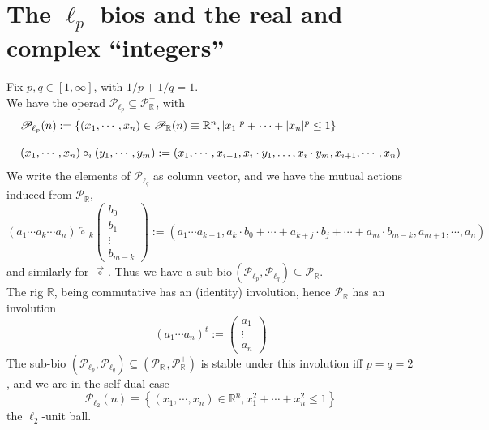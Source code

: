 \documentclass[leqno]{article}
\newcommand{\R}{\mathbb{R}}
\newcommand{\biop}{\mathscr{P}}
\newcommand{\circleftarrow}{\,\overleftarrow{\circ}\,}
\newcommand{\circrightarrow}{\,\overrightarrow{\circ}\,}
\numberwithin{equation}{section}
\begin{document}
\section{The $\ell_{p}$ bios and the real and complex ``integers''} \label{sec:3}
Fix $p,q\in [1,\infty]$, with $1/p + 1/q =1$. \\ 
We have the operad
$\biop_{\ell_p}\subseteq \biop_{\R}^{-}$, with 
\begin{equation}
        \begin{array}[H]{l}
		\biop_{\ell_p}(n):= \left\{ (x_1,\cdots, x_{n})\in \biop_{\R}(n)\equiv \R^{n},
		|x_1|^{p}+\cdots + |x_{n}|^{p}\le 1 \right\} \\\\
		(x_1,\cdots ,x_n)\circ_i (y_1,\cdots , y_m):=(x_1,\cdots, x_{i-1},x_{i}\cdot
		y_1,\ldots , x_i\cdot y_m,x_{i+1},\cdots , x_n)
	\end{array}
	\label{eq:3.1}
\end{equation}
We write the elements of $\biop_{\ell_q}$ as column vector, and we have the mutual actions
induced from $\biop_{\R}$,
\begin{equation}
				(a_1\cdots a_{k}\cdots a_n)\circleftarrow_{k}
				\begin{pmatrix}
								b_0\\b_1\\\vdots\\b_{m-k}				
				\end{pmatrix}
				:= (a_1\cdots a_{k-1},a_k\cdot b_0+\cdots
								+a_{k+j}\cdot b_{j}+\cdots + a_{m}\cdot b_{m-k},a_{m+1},\cdots ,
				a_{n})
				\label{eq:3.2}
\end{equation}
and similarly for $\circrightarrow$. Thus we have a $\text{sub}\text{-bio}\,(\biop_{\ell_p},\biop_{\ell_q})\subseteq \biop_{\R}$. \\
The rig $\R$, being commutative has an (identity) involution, hence $\biop_{\R}$ has an
involution 
\begin{equation}
				(a_1\cdots a_n)^{t}:=
				\begin{pmatrix}
								a_1\\\vdots\\ a_n
				\end{pmatrix}
				\label{3.3}
\end{equation}
The sub-bio $\left( \biop_{\ell_{p}}, \biop_{\ell_{q}} \right)\subseteq \left(
				\biop_{\R}^{-},\biop_{\R}^{+}
\right)$ is stable under this involution iff $p=q=2$, and we are in the self-dual case
\begin{equation}
				\biop_{\ell_2}(n)\equiv \left\{ (x_1,\cdots , x_{n})\in \R^n, x_1^{2}+\cdots
				+x_n^{2}\le 1 \right\}
				\label{eq:3.4}
\end{equation} the $\ell_2$-unit ball. \vspace{.1cm}\\
\end{document}
